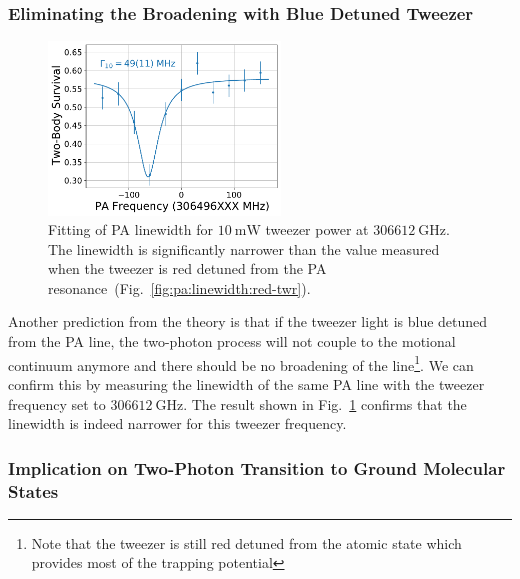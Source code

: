\subsubsection{Eliminating the Broadening with Blue Detuned Tweezer}
\label{ch:pa:linewidth:blue-tweezer}

\begin{figure}
  \centering
  \includegraphics[width=0.55\textwidth]{figures/pa_spectrum_v12_blue_10.pdf}
  \caption[PA linewidth for blue detuned tweezer]{
    Fitting of PA linewidth for $10~\mathrm{mW}$ tweezer power at $306612~\mathrm{GHz}$.
    The linewidth is significantly narrower than the value measured when the tweezer
    is red detuned from the PA resonance~(Fig.~\ref{fig:pa:linewidth:red-twr}).
    \label{fig:pa:linewidth:blue-twr}}
\end{figure}

Another prediction from the theory is that if the tweezer light is blue detuned from
the PA line, the two-photon process will not couple to the motional continuum anymore
and there should be no broadening of the line\footnote{
  Note that the tweezer is still red detuned from the atomic state which
  provides most of the trapping potential}.
We can confirm this by measuring the linewidth of the same PA line with the tweezer
frequency set to $306612~\mathrm{GHz}$.
The result shown in Fig.~\ref{fig:pa:linewidth:blue-twr}
confirms that the linewidth is indeed narrower for this tweezer frequency.

\subsubsection{Implication on Two-Photon Transition to Ground Molecular States}
\label{ch:pa:linewidth:raman}

